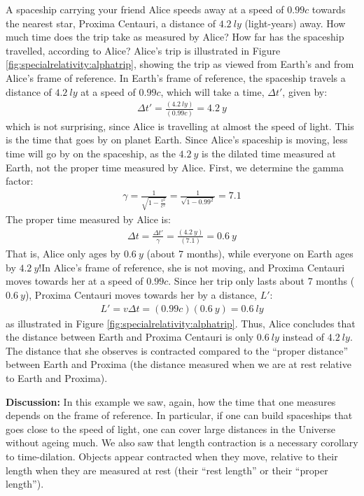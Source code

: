 \vspace{-0.3cm}
\begin{example}{\label{ex:specialrelativity:alphatrip}A spaceship carrying your friend Alice speeds away at a speed of $0.99c$ towards the nearest star, Proxima Centauri, a distance of $\SI{4.2}{ly}$ (light-years) away. How much time does the trip take as measured by Alice? How far has the spaceship travelled, according to Alice?}
Alice's trip is illustrated in Figure \ref{fig:specialrelativity:alphatrip}, showing the trip as viewed from Earth's and from Alice's frame of reference.
In Earth's frame of reference, the spaceship travels a distance of $\SI{4.2}{ly}$ at a speed of $0.99c$, which will take a time, $\Delta t'$, given by:
\begin{align*}
\Delta t' = \frac{(\SI{4.2}{ly})}{(0.99c)}=\SI{4.2}{y}
\end{align*}
which is not surprising, since Alice is travelling at almost the speed of light. This is the time that goes by on planet Earth. Since Alice's spaceship is moving, less time will go by on the spaceship, as the $\SI{4.2}{y}$ is the dilated time measured at Earth, not the proper time measured by Alice. First, we determine the gamma factor:
\begin{align*}
\gamma = \frac{1}{\sqrt{1-\frac{v^2}{c^2}}} =\frac{1}{\sqrt{1-0.99^2}}=7.1
\end{align*}
The proper time measured by Alice is:
\begin{align*}
\Delta t = \frac{\Delta t'}{\gamma}=\frac{(\SI{4.2}{y})}{(7.1)}=\SI{0.6}{y}
\end{align*}
That is, Alice only ages by $\SI{0.6}{y}$ (about 7 months), while everyone on Earth ages by $\SI{4.2}{y}$!In Alice's frame of reference, she is not moving, and Proxima Centauri moves towards her at a speed of $0.99c$. Since her trip only lasts about 7 months ($\SI{0.6}{y}$), Proxima Centauri moves towards her by a distance, $L'$:
\begin{align*}
L'=v\Delta t=(0.99c)(\SI{0.6}{y})=\SI{0.6}{ly}
\end{align*}
as illustrated in Figure \ref{fig:specialrelativity:alphatrip}. Thus, Alice concludes that the distance between Earth and Proxima Centauri is only $\SI{0.6}{ly}$ instead of $\SI{4.2}{ly}$. The distance that she observes is contracted compared to the ``proper distance'' between Earth and Proxima (the distance measured when we are at rest relative to Earth and Proxima).

\textbf{Discussion: }In this example we saw, again, how the time that one measures depends on the frame of reference. In particular, if one can build spaceships that goes close to the speed of light, one can cover large distances in the Universe without ageing much. We also saw that length contraction is a necessary corollary to time-dilation. Objects appear contracted when they move, relative to their length when they are measured at rest (their ``rest length'' or their ``proper length'').
\end{example}
